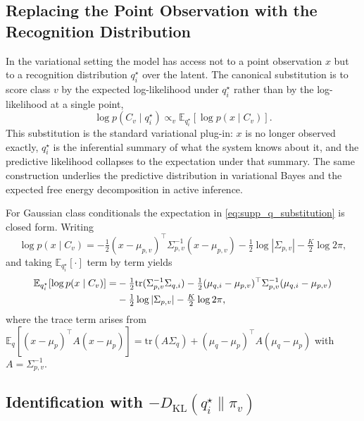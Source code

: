 \documentclass[twoside,11pt]{article}
\begin{document}
\subsection{Replacing the Point Observation with the Recognition Distribution}

In the variational setting the model has access not to a point observation $x$ but to a recognition distribution $q_i^{\star}$ over the latent. The canonical substitution is to score class $v$ by the expected log-likelihood under $q_i^{\star}$ rather than by the log-likelihood at a single point,
\begin{equation}
\log p(C_v \mid q_i^{\star}) \propto_v \mathbb{E}_{q_i^{\star}}[\log p(x \mid C_v)].
\label{eq:supp_q_substitution}
\end{equation}
This substitution is the standard variational plug-in: $x$ is no longer observed exactly, $q_i^{\star}$ is the inferential summary of what the system knows about it, and the predictive likelihood collapses to the expectation under that summary. The same construction underlies the predictive distribution in variational Bayes \cite[Eq.~5]{Blei2017} and the expected free energy decomposition in active inference.

For Gaussian class conditionals the expectation in \eqref{eq:supp_q_substitution} is closed form. Writing
\[
\log p(x \mid C_v) = -\tfrac{1}{2}(x - \mu_{p,v})^{\top} \Sigma_{p,v}^{-1} (x - \mu_{p,v}) - \tfrac{1}{2}\log|\Sigma_{p,v}| - \tfrac{K}{2}\log 2\pi,
\]
and taking $\mathbb{E}_{q_i^{\star}}[\cdot]$ term by term yields
\begin{align}
\mathbb{E}_{q_i^{\star}}[\log p(x \mid C_v)]
= & -\tfrac{1}{2} \mathrm{tr}(\Sigma_{p,v}^{-1} \Sigma_{q,i})
- \tfrac{1}{2} (\mu_{q,i} - \mu_{p,v})^{\top} \Sigma_{p,v}^{-1} (\mu_{q,i} - \mu_{p,v}) \notag \\
& - \tfrac{1}{2}\log|\Sigma_{p,v}| - \tfrac{K}{2}\log 2\pi,
\label{eq:supp_expected_loglik}
\end{align}
where the trace term arises from $\mathbb{E}_q[(x-\mu_p)^{\top} A (x-\mu_p)] = \mathrm{tr}(A \Sigma_q) + (\mu_q-\mu_p)^{\top} A (\mu_q-\mu_p)$ with $A = \Sigma_{p,v}^{-1}$.

\subsection{Identification with $-D_{\mathrm{KL}}(q_i^{\star} \| \pi_v)$}
\end{document}
